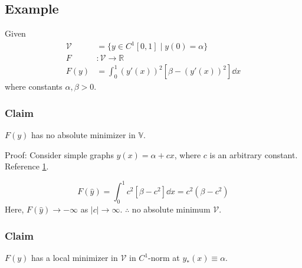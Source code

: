 \documentclass[12pt,twoside]{article}
\begin{document}
\subsection{Example}
Given
\begin{align*}
  \mathcal{V} &= \{y\in C^1[0,1] \;|\; y(0)=\alpha\} \\
  F&:\mathcal{V} \rightarrow \mathbb{R} \\
  F(y) &= \int_0^1 {(y'(x))}^2 [\beta-{(y'(x))}^2]\dd{x}
\end{align*}
where constants $\alpha, \beta > 0$.
\subsubsection*{Claim}
$F(y)$ has no absolute minimizer in $\mathbb{V}$.

Proof: Consider simple graphs $\hat{y}(x)=\alpha+cx$, where $c$ is an arbitrary
constant. Reference \cref{fig:what3}.

\begin{figure}[ht]
  \centering
  \caption{}
  \label{fig:what3}
\end{figure}

\begin{equation*}
  F(\hat{y}) = \int_0^1 c^2[\beta-c^2]\dd{x} = c^2(\beta-c^2)
\end{equation*}
Here, $F(\hat{y})\rightarrow -\infty$ as $|c|\rightarrow\infty$. $\therefore$ no
absolute minimum $\mathcal{V}$.

\subsubsection*{Claim}
$F(y)$ has a local minimizer in $\mathcal{V}$ in $C^1$-norm at
$y_*(x)\equiv\alpha$.
\end{document}
